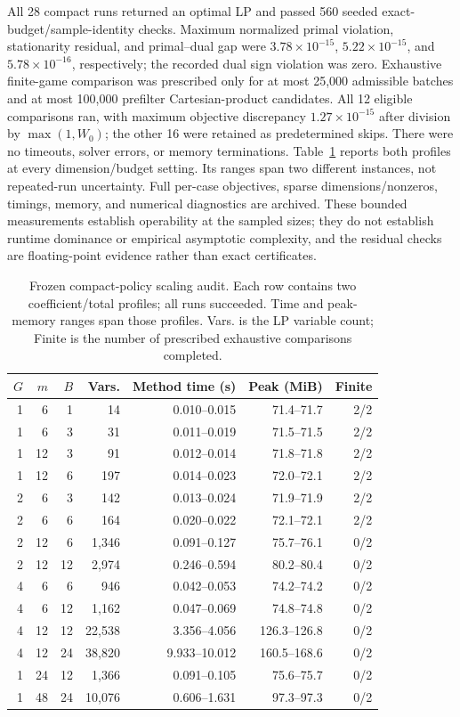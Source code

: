 \documentclass[12pt]{article}
\begin{document}
All 28 compact runs returned an optimal LP and passed 560 seeded exact-budget/sample-identity checks. Maximum normalized primal violation, stationarity residual, and primal--dual gap were $3.78\times10^{-15}$, $5.22\times10^{-15}$, and $5.78\times10^{-16}$, respectively; the recorded dual sign violation was zero. Exhaustive finite-game comparison was prescribed only for at most 25,000 admissible batches and at most 100,000 prefilter Cartesian-product candidates. All 12 eligible comparisons ran, with maximum objective discrepancy $1.27\times10^{-15}$ after division by $\max(1,W_0)$; the other 16 were retained as predetermined skips. There were no timeouts, solver errors, or memory terminations.
Table~\ref{tab:compact-scaling-audit} reports both profiles at every dimension/budget setting. Its ranges span two different instances, not repeated-run uncertainty. Full per-case objectives, sparse dimensions/nonzeros, timings, memory, and numerical diagnostics are archived. These bounded measurements establish operability at the sampled sizes; they do not establish runtime dominance or empirical asymptotic complexity, and the residual checks are floating-point evidence rather than exact certificates.
\begin{table}[htbp]
\centering\small
\caption{Frozen compact-policy scaling audit. Each row contains two coefficient/total profiles; all runs succeeded. Time and peak-memory ranges span those profiles. Vars. is the LP variable count; Finite is the number of prescribed exhaustive comparisons completed.}
\label{tab:compact-scaling-audit}
\begin{tabular}{rrrrrrr}
\hline
$G$ & $m$ & $B$ & Vars. & Method time (s) & Peak (MiB) & Finite \\
\hline
1 & 6 & 1 & 14 & 0.010--0.015 & 71.4--71.7 & 2/2 \\
1 & 6 & 3 & 31 & 0.011--0.019 & 71.5--71.5 & 2/2 \\
1 & 12 & 3 & 91 & 0.012--0.014 & 71.8--71.8 & 2/2 \\
1 & 12 & 6 & 197 & 0.014--0.023 & 72.0--72.1 & 2/2 \\
2 & 6 & 3 & 142 & 0.013--0.024 & 71.9--71.9 & 2/2 \\
2 & 6 & 6 & 164 & 0.020--0.022 & 72.1--72.1 & 2/2 \\
2 & 12 & 6 & 1,346 & 0.091--0.127 & 75.7--76.1 & 0/2 \\
2 & 12 & 12 & 2,974 & 0.246--0.594 & 80.2--80.4 & 0/2 \\
4 & 6 & 6 & 946 & 0.042--0.053 & 74.2--74.2 & 0/2 \\
4 & 6 & 12 & 1,162 & 0.047--0.069 & 74.8--74.8 & 0/2 \\
4 & 12 & 12 & 22,538 & 3.356--4.056 & 126.3--126.8 & 0/2 \\
4 & 12 & 24 & 38,820 & 9.933--10.012 & 160.5--168.6 & 0/2 \\
1 & 24 & 12 & 1,366 & 0.091--0.105 & 75.6--75.7 & 0/2 \\
1 & 48 & 24 & 10,076 & 0.606--1.631 & 97.3--97.3 & 0/2 \\
\hline
\end{tabular}
\end{table}
\end{document}

